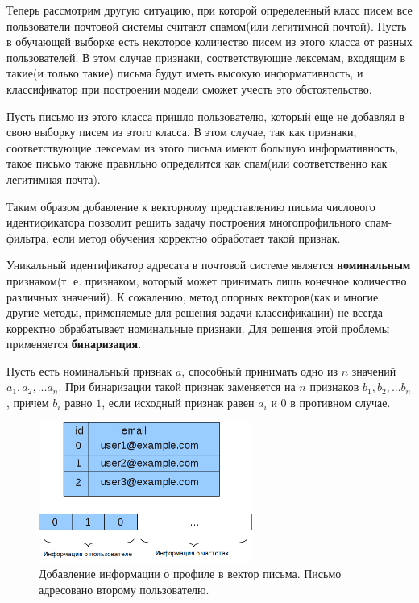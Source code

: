 Теперь рассмотрим другую ситуацию, при которой определенный класс писем все пользователи почтовой системы считают спамом(или легитимной почтой). Пусть в обучающей выборке есть некоторое количество писем из этого класса от разных пользователей. В этом случае признаки, соответствующие лексемам, входящим в такие(и только такие) письма будут иметь высокую информативность, и классификатор при построении модели сможет учесть это обстоятельство.

Пусть письмо из этого класса пришло пользователю, который еще не добавлял в свою выборку писем из этого класса. В этом случае, так как признаки, соответствующие лексемам из этого письма имеют большую информативность, такое письмо также правильно определится как спам(или соответственно как легитимная почта).

Таким образом добавление к векторному представлению письма числового идентификатора позволит решить задачу построения многопрофильного спам-фильтра, если метод обучения корректно обработает такой признак. 

Уникальный идентификатор адресата в почтовой системе является \textbf{номинальным} признаком(т. е. признаком, который может принимать лишь конечное количество различных значений). К сожалению, метод опорных векторов(как и многие другие методы, применяемые для решения задачи классификации) не всегда корректно обрабатывает номинальные признаки.\cite{YURYSVM} Для решения этой проблемы применяется \textbf{бинаризация}.

Пусть есть номинальный признак $a$, способный принимать одно из $n$ значений $a_1, a_2, ... a_n$. При бинаризации такой признак заменяется на $n$ признаков $b_1, b_2, ... b_n$, причем $b_i$ равно $1$, если исходный признак равен $a_i$ и $0$ в противном случае.

\begin{figure}[h]
\begin{center}
\includegraphics[width=7cm]{img/add_uid}
\end{center}
\caption{Добавление информации о профиле в вектор письма. Письмо адресовано второму пользователю.}
\label{multiprofile}
\end{figure}


